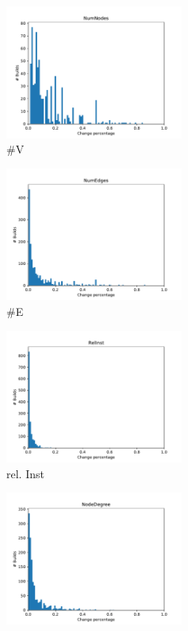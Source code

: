 \documentclass[sigplan, anonymous, review]{acmart}
\begin{document}
\begin{figure}[!t]
	\centering
	\begin{subfigure}{2.3in}
		\centering
		\includegraphics[width=2.3in]{assets/NumNodes.pdf}
		\caption{\#V}
		\label{numNodesHist}
	\end{subfigure}%
	\begin{subfigure}{2.3in}
		\centering
		\includegraphics[width=2.3in]{assets/NumEdges.pdf}
		\caption{\#E}
		\label{numEdgesHist}
	\end{subfigure}%
	\begin{subfigure}{2.3in}
		\centering
		\includegraphics[width=2.3in]{assets/RelInst.pdf}
		\caption{rel. Inst}
		\label{relInstHist}
	\end{subfigure}
	\begin{subfigure}{2.3in}
		\centering
		\includegraphics[width=2.3in]{assets/NodeDegree.pdf}

\end{subfigure}
\end{figure}
\end{document}
